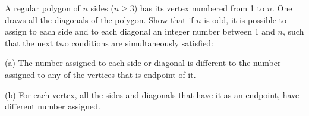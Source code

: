 A regular polygon of $ n$ sides ($ n\geq3$) has its vertex numbered from 1 to $ n$. One draws all the diagonals of the polygon. Show that if $ n$ is odd, it is possible to assign to each side and to each diagonal an integer number between 1 and $ n$,  such that the next two conditions are simultaneously satisfied:

(a) The number assigned to each side or diagonal is different to the number assigned to any of the vertices that is endpoint of it.

(b) For each vertex, all the sides and diagonals that have it as an endpoint, have different number assigned.